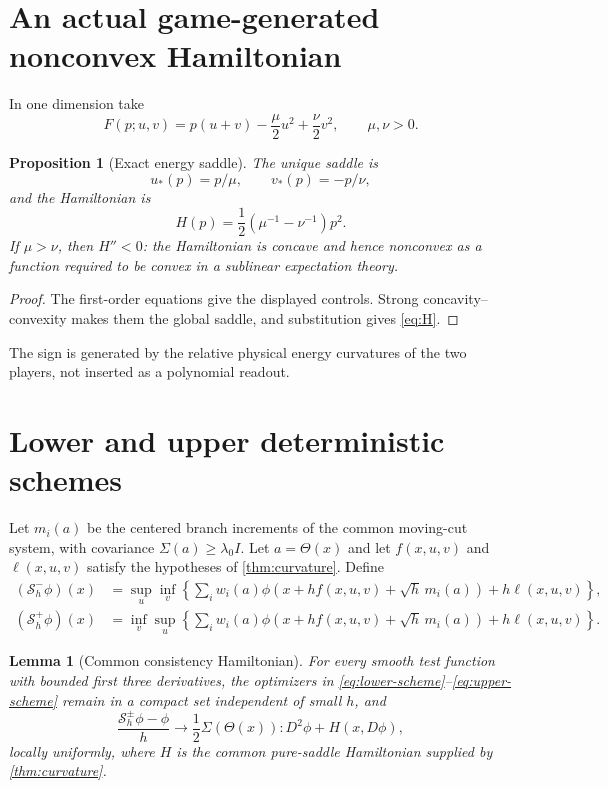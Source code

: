 \documentclass[11pt,reqno]{amsart}
\newtheorem{proposition}[theorem]{Proposition}
\newtheorem{lemma}[theorem]{Lemma}
\theoremstyle{definition}
\theoremstyle{remark}
\begin{document}
\section{An actual game-generated nonconvex Hamiltonian}\label{sec:quadratic}

In one dimension take
\begin{equation}\label{eq:quadratic}
 F(p;u,v)=p(u+v)-\frac\mu2u^2+
 \frac\nu2v^2,
 \qquad\mu,\nu>0.
\end{equation}

\begin{proposition}[Exact energy saddle]\label{prop:energy}
The unique saddle is
\[
 u_*(p)=p/\mu,
 \qquad v_*(p)=-p/\nu,
\]
and the Hamiltonian is
\begin{equation}\label{eq:H}
 H(p)=\frac12\left(\mu^{-1}-\nu^{-1}\right)p^2.
\end{equation}
If $\mu>\nu$, then $H''<0$: the Hamiltonian is concave and hence nonconvex as
a function required to be convex in a sublinear expectation theory.
\end{proposition}

\begin{proof}
The first-order equations give the displayed controls.  Strong
concavity--convexity makes them the global saddle, and substitution gives
\eqref{eq:H}.
\end{proof}

The sign is generated by the relative physical energy curvatures of the two
players, not inserted as a polynomial readout.

\section{Lower and upper deterministic schemes}\label{sec:schemes}

Let $m_i(a)$ be the centered branch increments of the common moving-cut system,
with covariance $\Sigma(a)\ge\lambda_0I$.  Let
$a=\Theta(x)$ and let $f(x,u,v)$ and $\ell(x,u,v)$ satisfy the hypotheses of
\cref{thm:curvature}.  Define
\begin{align}
 (\mathcal S_h^-\phi)(x)&=
 \sup_u\inf_v\left\{
 \sum_iw_i(a)
 \phi(x+h f(x,u,v)+\sqrt h\,m_i(a))
 +h\ell(x,u,v)\right\},\label{eq:lower-scheme}\\
 (\mathcal S_h^+\phi)(x)&=
 \inf_v\sup_u\left\{
 \sum_iw_i(a)
 \phi(x+h f(x,u,v)+\sqrt h\,m_i(a))
 +h\ell(x,u,v)\right\}.
 \label{eq:upper-scheme}
\end{align}

\begin{lemma}[Common consistency Hamiltonian]\label{lem:scheme-consistency}
For every smooth test function with bounded first three derivatives, the
optimizers in \eqref{eq:lower-scheme}--\eqref{eq:upper-scheme} remain in a
compact set independent of small $h$, and
\[
 \frac{\mathcal S_h^\pm\phi-\phi}{h}
 \longrightarrow
 \frac12\Sigma(\Theta(x)):D^2\phi+
 H(x,D\phi),
\]
locally uniformly, where $H$ is the common pure-saddle Hamiltonian supplied by
\cref{thm:curvature}.
\end{lemma}
\end{document}
